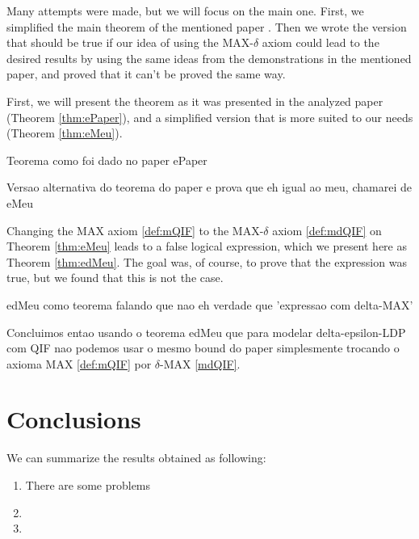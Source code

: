 \documentclass[conference]{IEEEtran}
\begin{document}
Many attempts were made, but we will focus on the main one. First, we simplified the main theorem of the mentioned paper \cite{fernandes2024explaining}. Then we wrote the version that should be true if our idea of using the MAX-$\delta$ axiom could lead to the desired results by using the same ideas from the demonstrations in the mentioned paper, and proved that it can't be proved the same way.

First, we will present the theorem as it was presented in the analyzed paper \cite{fernandes2024explaining} (Theorem \ref{thm:ePaper}), and a simplified version that is more suited to our needs (Theorem \ref{thm:eMeu}).

{\color{red} Teorema como foi dado no paper ePaper}

{\color{red} Versao alternativa do teorema do paper e prova que eh igual ao meu, chamarei de eMeu}

Changing the MAX axiom \ref{def:mQIF} to the MAX-$\delta$ axiom \ref{def:mdQIF} on Theorem \ref{thm:eMeu} leads to a false logical expression, which we present here as Theorem \ref{thm:edMeu}. The goal was, of course, to prove that the expression was true, but we found that this is not the case.

{\color{red} edMeu como teorema falando que nao eh verdade que 'expressao com delta-MAX'}

{\color{red} Concluimos entao usando o teorema edMeu que para modelar delta-epsilon-LDP com QIF nao podemos usar o mesmo bound do paper \cite{fernandes2024explaining} simplesmente trocando o axioma MAX \ref{def:mQIF} por $\delta$-MAX \ref{mdQIF}.}

\section{Conclusions}

We can summarize the results obtained as following:

\begin{enumerate}
	\item There are some problems
	\item
	\item
\end{enumerate}



\end{document}
